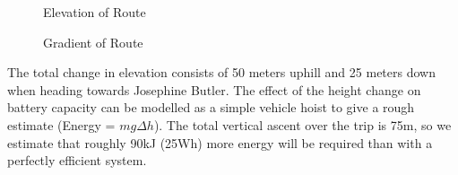 \documentclass[journal,10pt]{IEEEtran}
\begin{document}
            \begin{figure}[H]
                \centering
                \caption{Elevation of Route}
                \label{fig:elevation}
            \end{figure}
            \begin{figure}[H]
                \centering
                \caption{Gradient of Route}
                \label{fig:gradient}
            \end{figure}
            The total change in elevation consists of 50 meters uphill and 25 meters down when heading towards Josephine Butler. The effect of the height change on battery capacity can be modelled as a simple vehicle hoist to give a rough estimate (Energy = $mg\Delta h$). The total vertical ascent over the trip is 75m, so we estimate that roughly 90kJ (25Wh) more energy will be required than with a perfectly efficient system.
\end{document}
